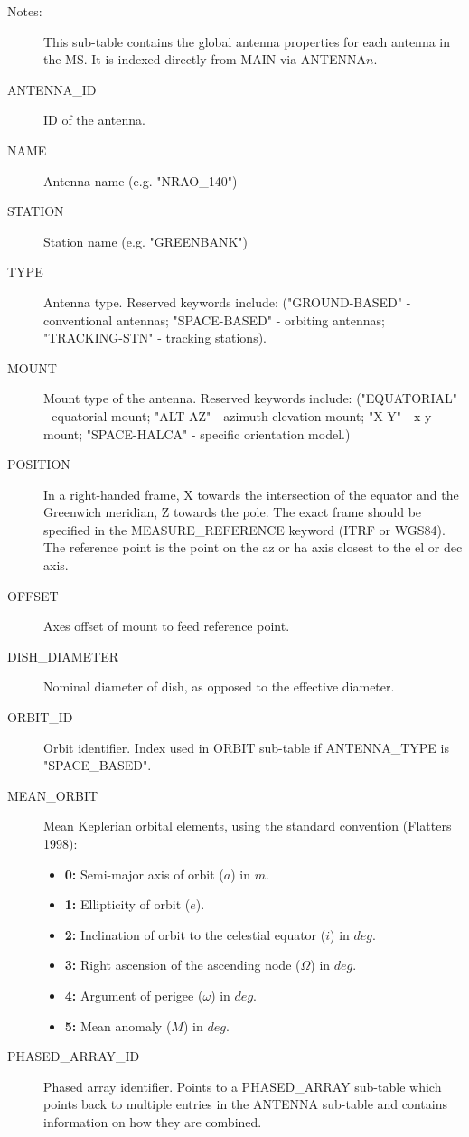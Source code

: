 \documentclass{article}
\begin{document}
\begin{description}

\item[Notes:] This sub-table contains the global antenna properties
for each antenna in the MS. It is indexed directly from MAIN via
ANTENNA$n$.
\item[ANTENNA\_ID] ID of the antenna.

\item[NAME] Antenna name (e.g. "NRAO\_140")

\item[STATION] Station name (e.g. "GREENBANK")

\item[TYPE] Antenna type. Reserved keywords include:
("GROUND-BASED" - conventional antennas; "SPACE-BASED" - orbiting
antennas; "TRACKING-STN" - tracking stations).

\item[MOUNT] Mount type of the antenna. Reserved keywords include:
("EQUATORIAL" - equatorial mount; "ALT-AZ" - azimuth-elevation mount; "X-Y"
- x-y mount; "SPACE-HALCA" - specific orientation model.)

\item[POSITION] In a right-handed frame, X towards the intersection of
the equator and the Greenwich meridian, Z towards the pole. The exact
frame should be specified in the MEASURE\_REFERENCE keyword (ITRF or
WGS84). The reference point is the point on the az or ha axis closest
to the el or dec axis.

\item[OFFSET] Axes offset of mount to feed reference point.

\item[DISH\_DIAMETER] Nominal diameter of dish, as opposed to the
effective diameter.

\item[ORBIT\_ID] Orbit identifier. Index used in ORBIT sub-table if
ANTENNA\_TYPE is "SPACE\_BASED".

\item[MEAN\_ORBIT] Mean Keplerian orbital elements, using the
standard convention (Flatters 1998):
\begin{itemize}
   \item{{\bf 0:} Semi-major axis of orbit ($a$) in $m$.}
   \item{{\bf 1:} Ellipticity of orbit ($e$).}
   \item{{\bf 2:} Inclination of orbit to the celestial equator ($i$)
                  in $deg.$}
   \item{{\bf 3:} Right ascension of the ascending node ($\Omega$) in $deg.$}
   \item{{\bf 4:} Argument of perigee ($\omega$) in $deg.$}
   \item{{\bf 5:} Mean anomaly ($M$) in $deg.$}
\end{itemize}

\item[PHASED\_ARRAY\_ID] Phased array identifier. Points to a
PHASED\_ARRAY sub-table which points back to multiple entries in the
ANTENNA sub-table and contains information on how they are combined.

\end{description}
\end{document}
